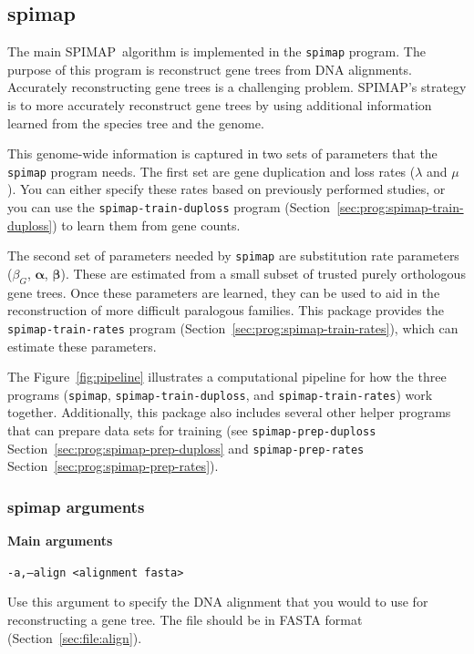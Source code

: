 \documentclass[11pt]{article}
\newcommand{\figref}[1]{Figure~\ref{#1}}
\newcommand{\secref}[1]{Section~\ref{#1}}
\newcommand{\spimap}{{\sf\scshape SPIMAP}}
\newcommand{\V}[1]{{\bm #1}}
\begin{document}
\subsection{spimap}
\label{sec:prog:spimap}

The main \spimap\ algorithm is implemented in the {\tt spimap} program.
The purpose of this program is reconstruct gene trees from DNA alignments.
Accurately reconstructing gene trees is a challenging problem.  \spimap's
strategy is to more accurately reconstruct gene trees by using additional 
information learned from the species tree and the genome.  

This genome-wide information is captured in two sets of parameters 
that the {\tt spimap} program needs.  The first set are gene duplication and
loss rates ($\lambda$ and $\mu$).  You can either specify these rates 
based on previously performed studies, or you can use the
{\tt spimap-train-duploss} program (\secref{sec:prog:spimap-train-duploss})
to learn them from gene counts.

The second set of parameters needed by {\tt spimap} are substitution rate
parameters ($\beta_G$, $\V{\alpha}$, $\V{\beta}$).  These are estimated
from a small subset of trusted purely orthologous gene trees.  Once these
parameters are learned, they can be used to aid in the reconstruction
of more difficult paralogous families.  This package provides the
{\tt spimap-train-rates} program (\secref{sec:prog:spimap-train-rates}),
which can estimate these parameters.

The \figref{fig:pipeline} illustrates a computational pipeline for how
the three programs ({\tt spimap}, {\tt spimap-train-duploss}, and 
{\tt spimap-train-rates}) work together.  Additionally, this package also
includes several other helper programs that can prepare data sets for 
training (see {\tt spimap-prep-duploss} \secref{sec:prog:spimap-prep-duploss}
and {\tt spimap-prep-rates} \secref{sec:prog:spimap-prep-rates}).


\subsubsection{spimap arguments}

{\bf Main arguments}

{\tt -a,--align  <alignment fasta>}

Use this argument to specify the DNA alignment that you would to use
for reconstructing a gene tree.  The file should be in FASTA format
(\secref{sec:file:align}).
\end{document}
